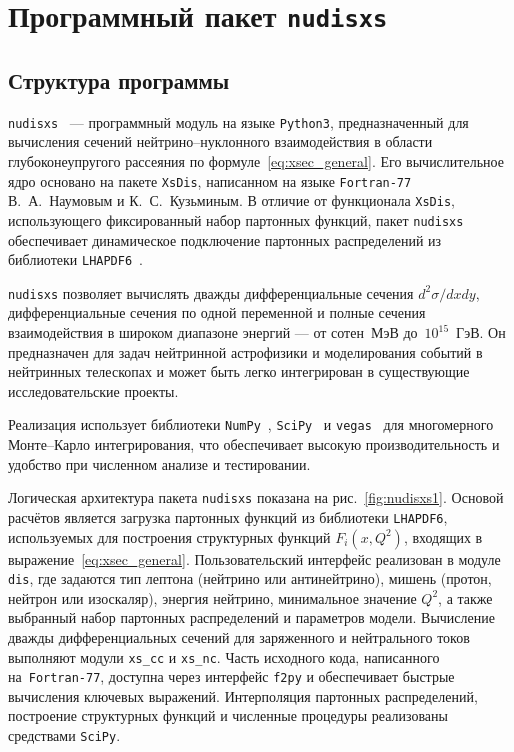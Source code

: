 \section{Программный пакет \texttt{nudisxs}}
\label{sec:nudisxs}
\subsection{Структура программы}
\texttt{nudisxs}~\cite{nudisxs2022} — программный модуль на языке \texttt{Python3}, предназначенный для вычисления сечений нейтрино–нуклонного взаимодействия в области глубоконеупругого рассеяния по формуле~\eqref{eq:xsec_general}. 
Его вычислительное ядро основано на пакете \texttt{XsDis}, написанном на языке \texttt{Fortran-77} В.~А.~Наумовым и К.~С.~Кузьминым. 
В отличие от функционала \texttt{XsDis}, использующего фиксированный набор партонных функций, пакет \texttt{nudisxs} обеспечивает динамическое подключение партонных распределений из библиотеки \texttt{LHAPDF6}~\cite{aartsenLHAPDF2020}.

\texttt{nudisxs} позволяет вычислять дважды дифференциальные сечения $d^2\sigma/dx dy$, дифференциальные сечения по одной переменной и полные сечения взаимодействия в широком диапазоне энергий — от сотен~МэВ до~$10^{15}$~ГэВ. 
Он предназначен для задач нейтринной астрофизики и моделирования событий в нейтринных телескопах и может быть легко интегрирован в существующие исследовательские проекты.

Реализация использует библиотеки \texttt{NumPy}~\cite{2020NumPy-Array}, \texttt{SciPy}~\cite{2020SciPy-NMeth} и \texttt{vegas}~\cite{lepageVegas2021} для многомерного Монте–Карло интегрирования, что обеспечивает высокую производительность и удобство при численном анализе и тестировании. 
%

Логическая архитектура пакета \texttt{nudisxs} показана на рис.~\ref{fig:nudisxs1}. 
Основой расчётов является загрузка партонных функций из библиотеки \texttt{LHAPDF6}, используемых для построения структурных функций $F_i(x, Q^2)$, входящих в выражение~\eqref{eq:xsec_general}. 
Пользовательский интерфейс реализован в модуле \texttt{dis}, где задаются тип лептона (нейтрино или антинейтрино), мишень (протон, нейтрон или изоскаляр), энергия нейтрино, минимальное значение $Q^2$, а также выбранный набор партонных распределений и параметров модели. 
Вычисление дважды дифференциальных сечений для заряженного и нейтрального токов выполняют модули \texttt{xs\_cc} и \texttt{xs\_nc}. 
Часть исходного кода, написанного на~\texttt{Fortran-77}, доступна через интерфейс \texttt{f2py} и обеспечивает быстрые вычисления ключевых выражений. 
Интерполяция партонных распределений, построение структурных функций и численные процедуры реализованы средствами \texttt{SciPy}.

